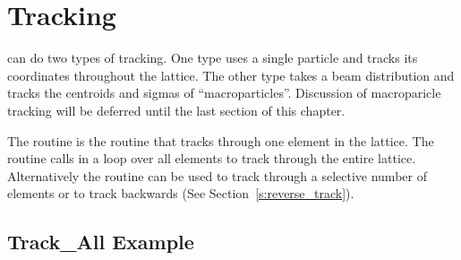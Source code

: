 \chapter{Tracking}
\label{c:tracking}

\bmad can do two types of tracking. One type uses a single particle
and tracks its coordinates throughout the lattice. The other type
takes a beam distribution and tracks the centroids and sigmas of
``macroparticles''. Discussion of macroparicle tracking will be
deferred until the last section of this chapter.

The routine  is the routine that tracks through one
element in the lattice. The routine  calls 
in a loop over all elements to track through the entire
lattice. Alternatively the routine  can be used to
track through a selective number of elements or to track backwards
(See Section~\ref{s:reverse_track}).

\section{Track\_All Example}

